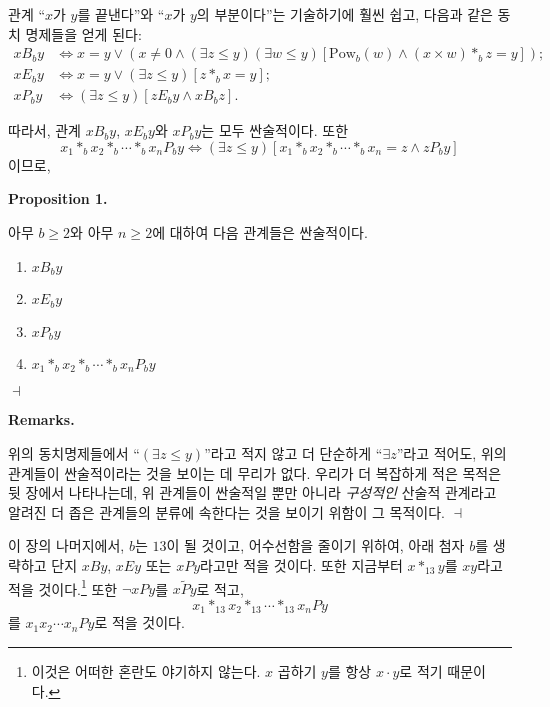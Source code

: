 \documentclass[12pt]{paper}
\newenvironment{context}[1][]
{ \noindent \textbf{{#1}.}
}
{ \hfill $ \dashv $
}
\begin{document}
관계 ``$x$가 $y$를 끝낸다''와 ``$x$가 $y$의 부분이다''는 기술하기에 훨씬 쉽고, 다음과 같은 동치 명제들을 얻게 된다:
\begin{align*}
x B_{b} y & \iff x = y \lor \left( x \ne 0 \land \left( \exists z \le y \right) \left( \exists w \le y \right) \left[ \mathrm{Pow}_{b} \left( w \right) \land \left( x \times w \right) *_{b} z = y \right] \right) ; \\
x E_{b} y & \iff x = y \lor \left( \exists z \le y \right) \left[ z *_{b} x = y \right] ; \\
x P_{b} y & \iff \left( \exists z \le y \right) \left[ z E_{b} y \land x B_{b} z \right] .
\end{align*}

따라서, 관계 $x B_{b} y$, $x E_{b} y$와 $x P_{b} y$는 모두 싼술적이다. 또한
$$ x_{1} *_{b} x_{2} *_{b} \cdots *_{b} x_{n} P_{b} y \iff \left( \exists z \le y \right) \left[ x_{1} *_{b} x_{2} *_{b} \cdots *_{b} x_{n} = z \land z P_{b} y \right] $$이므로,

\begin{context}[Proposition 1]
아무 $b \ge 2$와 아무 $n \ge 2$에 대하여 다음 관계들은 싼술적이다. 
\begin{enumerate}
\item $x B_{b} y$
\item $x E_{b} y$
\item $x P_{b} y$
\item $x_{1} *_{b} x_{2} *_{b} \cdots *_{b} x_{n} P_{b} y$
\end{enumerate} 
\end{context}

\begin{context}[Remarks]
위의 동치명제들에서 ``$\left( \exists z \le y \right)$''라고 적지 않고 더 단순하게 ``$\exists z$''라고 적어도,
위의 관계들이 싼술적이라는 것을 보이는 데 무리가 없다. 우리가 더 복잡하게 적은 목적은 뒷 장에서 나타나는데,
위 관계들이 싼술적일 뿐만 아니라 \textit{구성적인} 산술적 관계라고 알려진 더 좁은 관계들의 분류에 속한다는 것을 보이기 위함이 그 목적이다.
\end{context}

이 장의 나머지에서, $b$는 $13$이 될 것이고, 어수선함을 줄이기 위하여, 아래 첨자 $b$를 생략하고 단지 $x B y$, $x E y$ 또는 $x P y$라고만 적을 것이다.
또한 지금부터 $x *_{13} y$를 $x y$라고 적을 것이다.\footnote
{
이것은 어떠한 혼란도 야기하지 않는다. $x$ 곱하기 $y$를 항상 $x \cdot y$로 적기 때문이다.
}
또한 $\lnot x P y$를 $x \tilde{P} y$로 적고, $$ x_1 *_{13} x_2 *_{13} \cdots *_{13} x_{n} P y $$를 $x_1 x_2 \cdots x_{n} P y$로 적을 것이다. 
\end{document}
